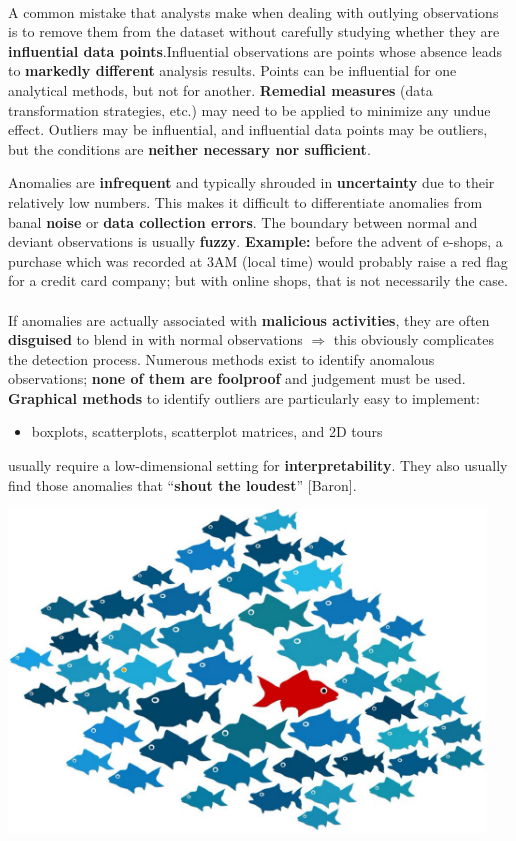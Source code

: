 \documentclass[20pt,landscape,footrule,headrule]{foils}
\newcommand{\newl}{\newline\newline}
\def\fh{\foilhead}
\begin{document}
\newpage\ \\ \noindent A common mistake that analysts make when dealing with outlying observations is to remove them from the dataset without carefully studying whether they are \textbf{influential data points}.\newl Influential observations are points whose absence leads to \textbf{markedly different} analysis results.
\newl Points can be influential for one analytical methods, but not for another. 
\newl \textbf{Remedial measures} (data transformation strategies, etc.) may need to be applied to minimize any undue effect. 
\newl Outliers may be influential, and influential data points may be outliers, but the conditions are \textbf{neither necessary nor sufficient}. 


\fh{Anomalies} 

\noindent Anomalies are \textbf{infrequent} and typically shrouded in \textbf{uncertainty} due to their relatively low numbers.  
\newl This makes it difficult to differentiate anomalies from banal \textbf{noise} or \textbf{data collection errors}. 
\newl The boundary between normal and deviant observations is usually \textbf{fuzzy}.
\newl \textbf{Example:} before the advent of e-shops, a purchase which was recorded at 3AM (local time) would probably raise a red flag for a credit card company; but with online shops, that is not necessarily the case. 
\newpage\ \\ \noindent If anomalies are actually associated with \textbf{malicious activities}, they are often \textbf{disguised} to blend in with normal observations $\Longrightarrow$ this obviously complicates the detection process.
\newl Numerous methods exist to identify anomalous observations; \textbf{none of them are foolproof} and judgement must be used. 
\newl \textbf{Graphical methods} to identify outliers are particularly easy to implement:
\begin{itemize}
\item boxplots, scatterplots, scatterplot matrices, and 2D tours
\end{itemize} usually require a  low-dimensional setting for  \textbf{interpretability}. 
\newl They also usually find those anomalies that ``\textbf{shout the loudest}'' [Baron]. 
\newpage
\begin{center}
\includegraphics[width=0.95\textwidth]{Images/fish.png}
\end{center}
\end{document}

